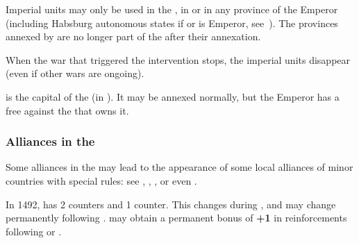  Imperial units may only be used in the \HRE,
in  or in any province of the Emperor (including Habsburg
autonomous states if \HAB or \SPA is Emperor,
see~).
\bparag The provinces annexed by \FRA are no longer part of the \HRE
after their annexation.

 When the war that triggered the
intervention stops, the imperial units disappear (even if other wars are
ongoing).

  is the capital of the
\HRE (in ). It may be annexed normally, but the
Emperor has a free \CB against the \MAJ that owns it.

\subsubsection{Alliances in the \HRE}
\aparag Some alliances in the \HRE may lead to the appearance of some
local alliances of minor countries with special rules: see
, ,
,
 or even
.

\aparag In 1492,  has 2 \ARMY counters and
 1 \ARMY counter. This changes during ,
and may change permanently following .
\bparag {} may obtain a permanent bonus of {\bf +1} in
reinforcements following  or
.

